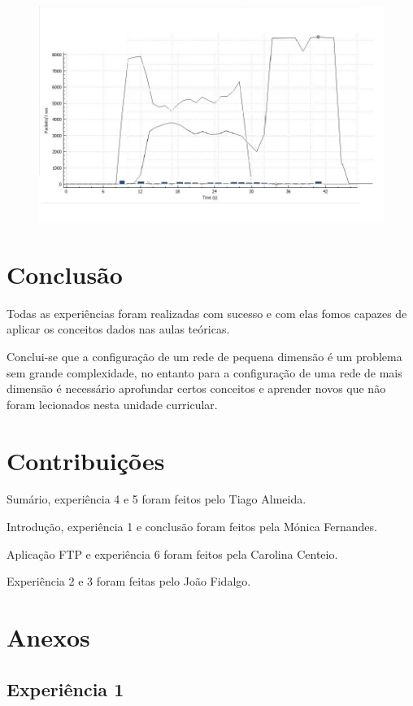 \documentclass[a4paper]{article}
\begin{document}
\begin{figure}[!ht]
\centering
\includegraphics[scale=0.35]{tuxexp6.jpg}
\end{figure}

\section{Conclusão}

Todas as experiências foram realizadas com sucesso e com elas fomos capazes de aplicar os conceitos dados nas aulas teóricas. 

Conclui-se que a configuração de um rede de pequena dimensão é um problema sem grande complexidade, no entanto para a configuração de uma rede de mais dimensão é necessário aprofundar certos conceitos e aprender novos que não foram lecionados nesta unidade curricular.

\section{Contribuições}

Sumário, experiência 4 e 5 foram feitos pelo Tiago Almeida.

Introdução, experiência 1 e conclusão foram feitos pela Mónica Fernandes.

Aplicação FTP e experiência 6 foram feitos pela Carolina Centeio.

Experiência 2 e 3 foram feitas pelo João Fidalgo.

\newpage
\section{Anexos}
\subsection{Experiência 1}
\end{document}
